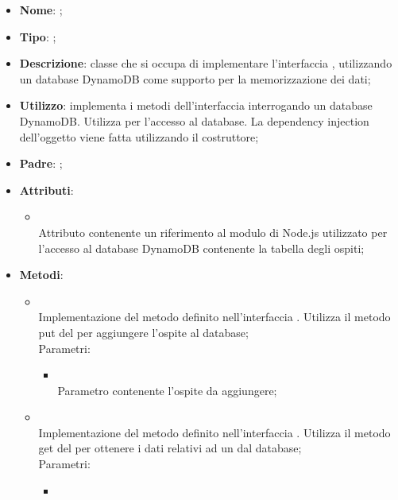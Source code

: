 \begin{itemize}
	\item \textbf{Nome}: ;
	\item \textbf{Tipo}: ;
	\item \textbf{Descrizione}: classe che si occupa di implementare l'interfaccia , utilizzando un database DynamoDB come supporto per la memorizzazione dei dati;
	\item \textbf{Utilizzo}: implementa i metodi dell'interfaccia  interrogando un database DynamoDB. Utilizza  per l'accesso al database. La dependency injection dell'oggetto  viene fatta utilizzando il costruttore;
	\item \textbf{Padre}: ;
	\item \textbf{Attributi}:
	\begin{itemize}
		\item[]  \\
		Attributo contenente un riferimento al modulo di Node.js utilizzato per l'accesso al database DynamoDB contenente la tabella degli ospiti;
	\end{itemize}
	\item \textbf{Metodi}:
	\begin{itemize}
		\item[]  \\
		Implementazione del metodo definito nell'interfaccia . Utilizza il metodo put del  per aggiungere l'ospite al database;\\
		Parametri:
		\begin{itemize}
			\item {} \\
			Parametro contenente l'ospite da aggiungere;
		\end{itemize}
		\item[]  \\
		Implementazione del metodo definito nell'interfaccia . Utilizza il metodo get del  per ottenere i dati relativi ad un  dal database;\\
		Parametri:
		\begin{itemize}
			\item {} \\

\end{itemize}
\end{itemize}
\end{itemize}
